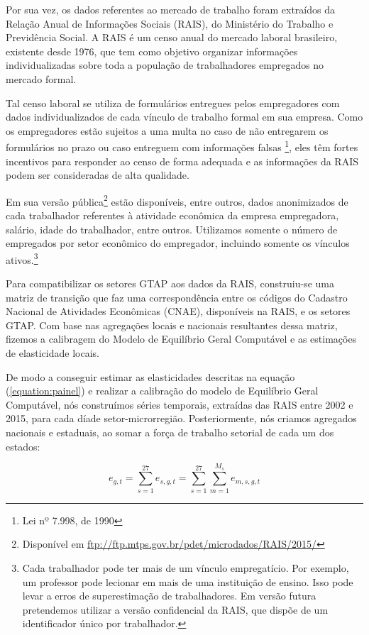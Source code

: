 \documentclass{article}
\begin{document}
Por sua vez, os dados referentes ao mercado de trabalho foram extraídos da Relação Anual de Informações Sociais (RAIS), do Ministério do Trabalho e Previdência Social. A RAIS é um censo anual do mercado laboral brasileiro, existente desde 1976, que tem como objetivo organizar informações individualizadas sobre toda a população de trabalhadores empregados no mercado formal.

Tal censo laboral se utiliza de formulários entregues pelos empregadores com dados individualizados de cada vínculo de trabalho formal em sua empresa. Como os empregadores estão sujeitos a uma multa no caso de não entregarem os formulários no prazo ou caso entreguem com informações falsas \footnote{Lei nº 7.998, de 1990}, eles têm fortes incentivos para responder ao censo de forma adequada \textemdash e as informações da RAIS podem ser consideradas de alta qualidade.

Em sua versão pública\footnote{Disponível em \url{ftp://ftp.mtps.gov.br/pdet/microdados/RAIS/2015/}} estão disponíveis, entre outros, dados anonimizados de cada trabalhador referentes à atividade econômica da empresa empregadora, salário, idade do trabalhador, entre outros. Utilizamos somente o número de empregados por setor econômico do empregador, incluindo somente os vínculos ativos.\footnote{Cada trabalhador pode ter mais de um vínculo empregatício. Por exemplo, um professor pode lecionar em mais de uma instituição de ensino. Isso pode levar a erros de superestimação de trabalhadores. Em versão futura pretendemos utilizar a versão confidencial da RAIS, que dispõe de um identificador único por trabalhador.}

Para compatibilizar os setores GTAP aos dados da RAIS, construiu-se uma matriz de transição que faz uma correspondência entre os códigos do Cadastro Nacional de Atividades Econômicas (CNAE), disponíveis na RAIS, e os setores GTAP. Com base nas agregações locais e nacionais resultantes dessa matriz, fizemos a calibragem do Modelo de Equilíbrio Geral Computável e as estimações de elasticidade locais.

De modo a conseguir estimar as elasticidades descritas na equação (\ref{equation:painel}) e realizar a calibração do modelo de Equilíbrio Geral Computável, nós construímos séries temporais, extraídas das RAIS entre 2002 e 2015, para cada díade setor-microrregião. Posteriormente, nós criamos agregados nacionais e estaduais, ao somar a força de trabalho setorial de cada um dos estados:

\begin{equation}
    e_{g,t} = \sum_{s=1}^{27} e_{s,g,t} =  \sum_{s=1}^{27} \sum_{m=1}^{M_s} e_{m,s,g,t}
    \label{eq:agg}
\end{equation}
\end{document}
